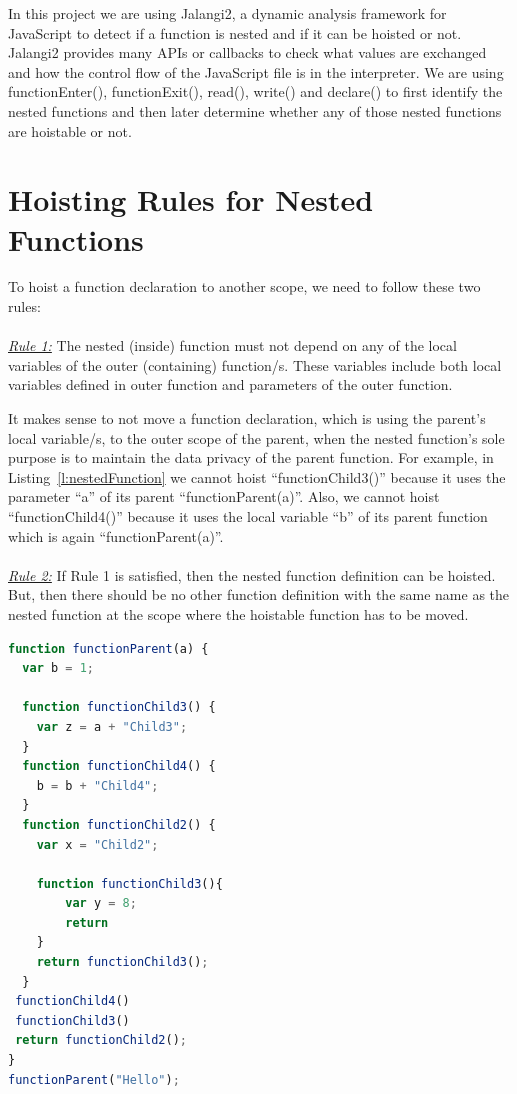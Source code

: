 \documentclass[authoryear,preprint]{sigplanconf}
\begin{document}
In this project we are using Jalangi2, a dynamic analysis framework for JavaScript to detect if a function is nested and if it can be hoisted or not. Jalangi2 provides many APIs or callbacks to check what values are exchanged and how the control flow of the JavaScript file is in the interpreter. We are using functionEnter(), functionExit(), read(), write() and declare() to first identify the nested functions and then later determine whether any of those nested functions are hoistable or not.



\section{Hoisting Rules for Nested Functions}
\label{sec:hoisting_rules}
To hoist a function declaration to another scope, we need to follow these two rules:\\\\
{\underline{\textit{Rule 1:}}} The nested (inside) function must not depend on any of the local variables of the outer (containing) function/s. These variables include both local variables defined in outer function and parameters of the outer function. \\\par

It makes sense to not move a function declaration, which is using the parent's local variable/s, to the outer scope of the parent, when the nested function's sole purpose is to maintain the data privacy of the parent function. For example, in Listing~\ref{l:nestedFunction} we cannot hoist \enquote{functionChild3()} because it uses the parameter \enquote{a} of its parent \enquote{functionParent(a)}. Also, we cannot hoist \enquote{functionChild4()} because it uses the local variable \enquote{b} of its parent function which is again \enquote{functionParent(a)}. \\\\
{\underline{\textit{Rule 2:}}} If Rule 1 is satisfied, then the nested function definition can be hoisted. But, then there should be no other function definition with the same name as the nested function at the scope where the hoistable function has to be moved. \\\par


\lstset{numbers=left, numberstyle=\tiny, stepnumber=1, numbersep=5pt}
\lstset{basicstyle=\ttfamily}
\lstset{frame=tb, frame=bottomline}

\begin{lstlisting}[float,caption= Nested Function Declaration Example ,label=l:nestedFunction,language=JavaScript]
function functionParent(a) {
  var b = 1;

  function functionChild3() { 
    var z = a + "Child3";
  }
  function functionChild4() { 
    b = b + "Child4";
  }
  function functionChild2() { 
    var x = "Child2";

    function functionChild3(){
        var y = 8;
        return
    }
    return functionChild3();
  }
 functionChild4()
 functionChild3()
 return functionChild2();
}
functionParent("Hello");
\end{lstlisting} 
\end{document}
